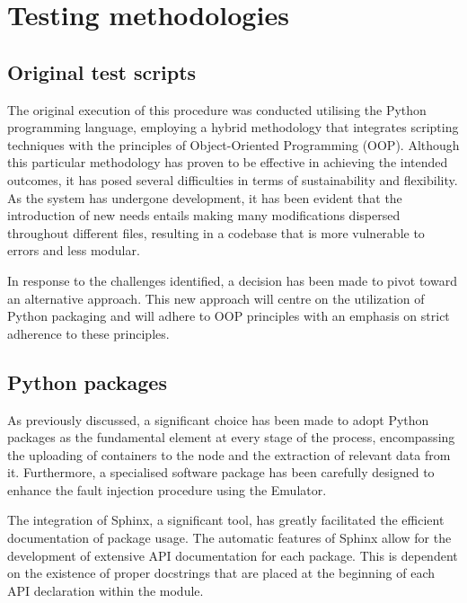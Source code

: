
\chapter{Testing methodologies} %

\label{ch:methodologies}


\section{Original test scripts}

The original execution of this procedure was conducted utilising the Python programming language, employing a hybrid methodology that integrates scripting techniques with the principles of Object-Oriented Programming (OOP). Although this particular methodology has proven to be effective in achieving the intended outcomes, it has posed several difficulties in terms of sustainability and flexibility. As the system has undergone development, it has been evident that the introduction of new needs entails making many modifications dispersed throughout different files, resulting in a codebase that is more vulnerable to errors and less modular.

In response to the challenges identified, a decision has been made to pivot toward an alternative approach. This new approach will centre on the utilization of Python packaging and will adhere to OOP principles with an emphasis on strict adherence to these principles.

\section{Python packages}

As previously discussed, a significant choice has been made to adopt Python packages as the fundamental element at every stage of the process, encompassing the uploading of containers to the node and the extraction of relevant data from it. Furthermore, a specialised software package has been carefully designed to enhance the fault injection procedure using the Emulator.

The integration of Sphinx, a significant tool, has greatly facilitated the efficient documentation of package usage. The automatic features of Sphinx allow for the development of extensive API documentation for each package. This is dependent on the existence of proper docstrings that are placed at the beginning of each API declaration within the module.

